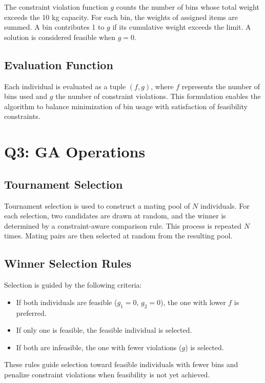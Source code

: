 \documentclass[journal,12pt,onecolumn]{IEEEtran}
\begin{document}
The constraint violation function $g$ counts the number of bins whose total weight exceeds the 10 kg capacity. For each bin, the weights of assigned items are summed. A bin contributes 1 to $g$ if its cumulative weight exceeds the limit. A solution is considered feasible when $g = 0$.

\subsection{Evaluation Function}

Each individual is evaluated as a tuple $(f, g)$, where $f$ represents the number of bins used and $g$ the number of constraint violations. This formulation enables the algorithm to balance minimization of bin usage with satisfaction of feasibility constraints.


\section{Q3: GA Operations}

\subsection{Tournament Selection}

Tournament selection is used to construct a mating pool of $N$ individuals. For each selection, two candidates are drawn at random, and the winner is determined by a constraint-aware comparison rule. This process is repeated $N$ times. Mating pairs are then selected at random from the resulting pool.

\subsection{Winner Selection Rules}

Selection is guided by the following criteria:
\begin{itemize}
    \item If both individuals are feasible ($g_1 = 0$, $g_2 = 0$), the one with lower $f$ is preferred.
    \item If only one is feasible, the feasible individual is selected.
    \item If both are infeasible, the one with fewer violations ($g$) is selected.
\end{itemize}

These rules guide selection toward feasible individuals with fewer bins and penalize constraint violations when feasibility is not yet achieved.
\end{document}
